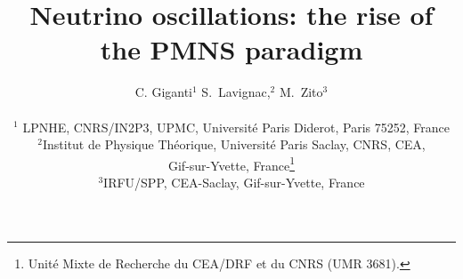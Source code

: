 \documentclass[twoside,12pt]{article}
\begin{document}



\title{Neutrino oscillations: the rise of the PMNS paradigm}

\author{C. Giganti$^1$ S.\ Lavignac,$^2$ M.\ Zito$^3$ \\
\\
$^1$ LPNHE, CNRS/IN2P3, UPMC, Universit\'{e} Paris Diderot, Paris 75252, France\\
$^2$Institut de Physique Th\'{e}orique,
Universit\'e Paris Saclay, CNRS, CEA,\\
Gif-sur-Yvette, France\footnote{Unit\'e Mixte de Recherche
du CEA/DRF et du CNRS (UMR 3681).}\\
$^3$IRFU/SPP, CEA-Saclay, Gif-sur-Yvette, France}
\end{document}
